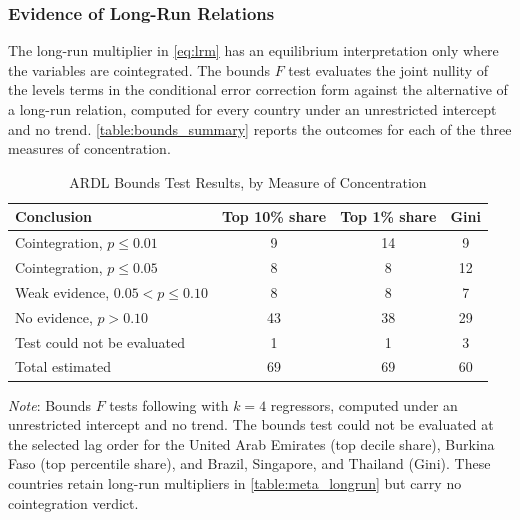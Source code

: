 \documentclass[12pt, titlepage]{article}
\numberwithin{equation}{section}
\begin{document}
\subsubsection{Evidence of Long-Run Relations}

The long-run multiplier in \eqref{eq:lrm} has an equilibrium interpretation
only where the variables are cointegrated. The bounds $F$ test evaluates the
joint nullity of the levels terms in the conditional error correction form
against the alternative of a long-run relation, computed for every country
under an unrestricted intercept and no trend. \autoref{table:bounds_summary}
reports the outcomes for each of the three measures of concentration.

\begin{table}[htbp]
	\centering
	\begin{threeparttable}
		\caption{ARDL Bounds Test Results, by Measure of Concentration}
		\label{table:bounds_summary}
		\begin{small}
			\begin{tabular}{lccc}
				\toprule
				\textbf{Conclusion} & \textbf{Top 10\% share} & \textbf{Top 1\% share} & \textbf{Gini} \\
				\midrule
				Cointegration, $p \leq 0.01$        & 9  & 14 & 9  \\
				Cointegration, $p \leq 0.05$        & 8  & 8  & 12 \\
				Weak evidence, $0.05 < p \leq 0.10$ & 8  & 8  & 7  \\
				No evidence, $p > 0.10$             & 43 & 38 & 29 \\
				\addlinespace
				Test could not be evaluated         & 1  & 1  & 3  \\
				\midrule
				Total estimated                     & 69 & 69 & 60 \\
				\bottomrule
			\end{tabular}
		\end{small}
		\begin{tablenotes}
			\footnotesize
			\item \emph{Note}: Bounds $F$ tests following \cite{PesaranShinSmith2001}
			with $k = 4$ regressors, computed under an unrestricted intercept and no
			trend. The bounds test could not be evaluated at the selected lag order for
			the United Arab Emirates (top decile share), Burkina Faso (top percentile
			share), and Brazil, Singapore, and Thailand (Gini). These countries retain
			long-run multipliers in \autoref{table:meta_longrun} but carry no
			cointegration verdict.
		\end{tablenotes}
	\end{threeparttable}
\end{table}
\end{document}
